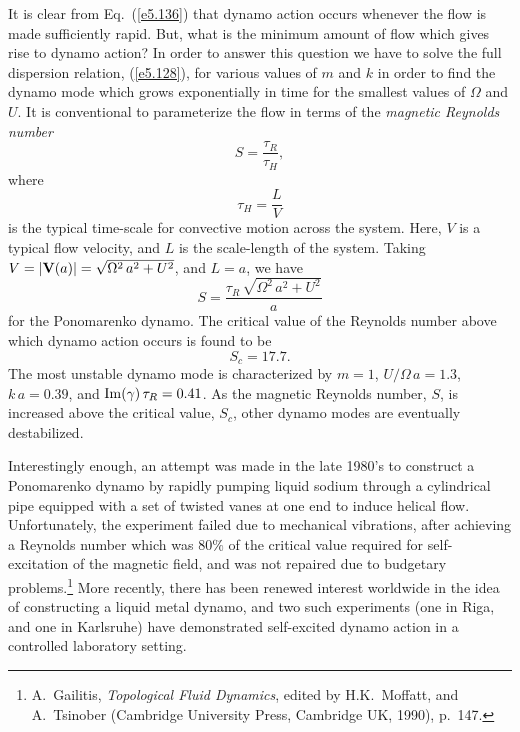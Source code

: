 It is clear from Eq.~(\ref{e5.136}) that dynamo action occurs whenever the flow
is made sufficiently rapid. But, what is the minimum amount of flow
which gives rise to dynamo action? 
In order to answer this question we 
have to solve the full dispersion relation, (\ref{e5.128}), for various values
of $m$ and $k$ in order to find the dynamo mode which grows exponentially in time
for the smallest values of ${\Omega}$ and $U$. It is conventional
to parameterize the flow in terms of the {\em magnetic Reynolds number}
\begin{equation}
S = \frac{\tau_R}{\tau_H},
\end{equation}
where
\begin{equation}
\tau_H = \frac{L}{V}
\end{equation}
is the typical time-scale for convective motion across the system. Here,
$V$ is a typical flow velocity, and $L$ is the scale-length of the system.
Taking $V=|{\bf V}(a)|= \sqrt{{\Omega}^2\,a^2+U^2}$, and $L=a$, we 
have
\begin{equation}
S = \frac{\tau_R\,\sqrt{{\Omega}^2\,a^2+U^2}}{a}
\end{equation}
for the Ponomarenko dynamo. The critical value of the Reynolds number above
which dynamo action occurs is found to be 
\begin{equation}
S_c = 17.7.
\end{equation}
The most unstable dynamo mode is characterized by
 $m=1$, $U/{\Omega}\,a=1.3$, $k\,a=0.39$,
and ${\rm Im}(\gamma)\,\tau_R = 0.41$. As the magnetic Reynolds number, $S$, 
 is increased above
the critical value, $S_c$,  other  dynamo modes are eventually destabilized.

Interestingly enough, an attempt was made in the late 1980's to construct a
Ponomarenko dynamo by rapidly pumping liquid sodium through a cylindrical
pipe equipped with a set of twisted vanes at one end to induce helical
flow. Unfortunately, the experiment failed due to mechanical vibrations,
after achieving  a Reynolds number which was $80\%$ of the critical value required
for self-excitation of the magnetic field, and was not repaired due to budgetary
problems.\footnote{A.~Gailitis, {\em Topological Fluid Dynamics}, edited
by H.K.~Moffatt, and A.~Tsinober (Cambridge University Press,
Cambridge UK, 1990), p.~147.} More recently, there has been renewed
interest worldwide in the idea of
 constructing a liquid metal dynamo, and two such experiments (one in Riga, and one in Karlsruhe) have demonstrated
self-excited dynamo action in a controlled
laboratory setting. 

